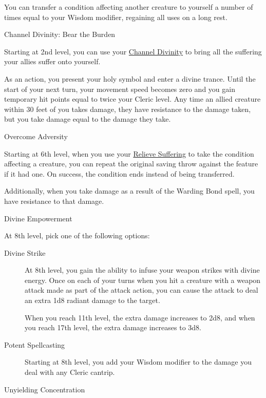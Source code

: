 You can transfer a condition affecting another creature to yourself a
number of times equal to your Wisdom modifier, regaining all uses on a
long rest.

Channel Divinity: Bear the Burden

Starting at 2nd level, you can use your
\hyperref[cleric-feature-channel-divinity]{Channel Divinity} to bring
all the suffering your allies suffer onto yourself.

As an action, you present your holy symbol and enter a divine trance.
Until the start of your next turn, your movement speed becomes zero and
you gain temporary hit points equal to twice your Cleric level. Any time
an allied creature within 30 feet of you takes damage, they have
resistance to the damage taken, but you take damage equal to the damage
they take.

Overcome Adversity

Starting at 6th level, when you use your
\hyperref[cleric-subclass-matryr-relieve-suffering]{Relieve Suffering}
to take the condition affecting a creature, you can repeat the original
saving throw against the feature if it had one. On success, the
condition ends instead of being transferred.

Additionally, when you take damage as a result of the Warding Bond
spell, you have resistance to that damage.

Divine Empowerment

At 8th level, pick one of the following options:

\begin{description}
\item[Divine Strike]
At 8th level, you gain the ability to infuse your weapon strikes with
divine energy. Once on each of your turns when you hit a creature with a
weapon attack made as part of the attack action, you can cause the
attack to deal an extra 1d8 radiant damage to the target.

When you reach 11th level, the extra damage increases to 2d8, and when
you reach 17th level, the extra damage increases to 3d8.
\end{description}

\begin{description}
\item[Potent Spellcasting]
Starting at 8th level, you add your Wisdom modifier to the damage you
deal with any Cleric cantrip.
\end{description}

Unyielding Concentration

